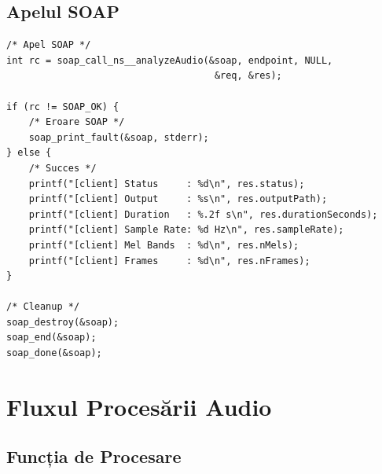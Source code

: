 \documentclass[12pt,a4paper,oneside]{book}
\begin{document}
\subsection{Apelul SOAP}

\begin{lstlisting}[caption=Executarea apelului SOAP]
/* Apel SOAP */
int rc = soap_call_ns__analyzeAudio(&soap, endpoint, NULL, 
                                     &req, &res);

if (rc != SOAP_OK) {
    /* Eroare SOAP */
    soap_print_fault(&soap, stderr);
} else {
    /* Succes */
    printf("[client] Status     : %d\n", res.status);
    printf("[client] Output     : %s\n", res.outputPath);
    printf("[client] Duration   : %.2f s\n", res.durationSeconds);
    printf("[client] Sample Rate: %d Hz\n", res.sampleRate);
    printf("[client] Mel Bands  : %d\n", res.nMels);
    printf("[client] Frames     : %d\n", res.nFrames);
}

/* Cleanup */
soap_destroy(&soap);
soap_end(&soap);
soap_done(&soap);
\end{lstlisting}

\section{Fluxul Procesării Audio}

\subsection{Funcția de Procesare}
\end{document}

